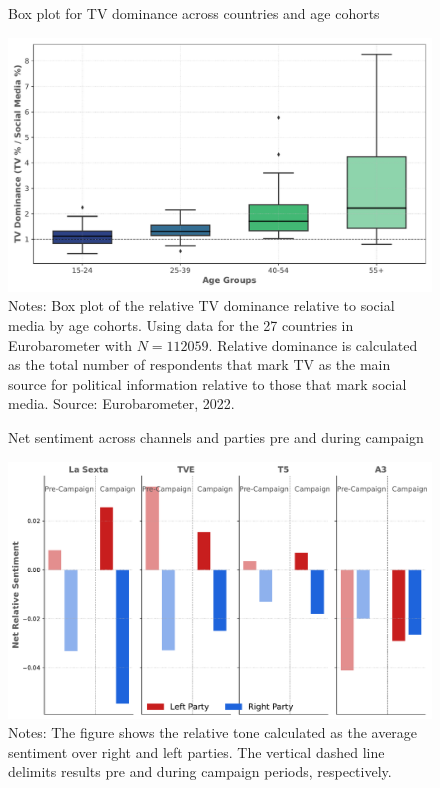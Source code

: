 \documentclass[12pt]{article}
\begin{document}
	
	
	
	\begin{figure}[H]
		\centering
		\caption{Box plot for TV dominance across countries and age cohorts}
		\includegraphics[width=120mm]{figures/age_cohorts_full}
		\caption*{\small Notes: Box plot of the relative TV dominance relative to social media by age cohorts. Using data for the 27 countries in Eurobarometer with $N=112059.$ Relative dominance is calculated as the total number of respondents that mark TV as the main source for political information relative to those that mark social media. 
			Source: Eurobarometer, 2022. }
		\label{fig:motivation2}
	\end{figure}
	
	\begin{figure}[H]
		\caption{Net sentiment across channels and parties pre and during campaign }
		\centering
		\includegraphics[width=150mm]{figures/average_tone_pre_post_election}
		\caption*{\small Notes: The figure shows the relative tone calculated as the average sentiment over right and left parties. The vertical dashed line delimits results pre and during campaign periods, respectively. }
		\label{fig:tone2}
	\end{figure}
	
\end{document}
